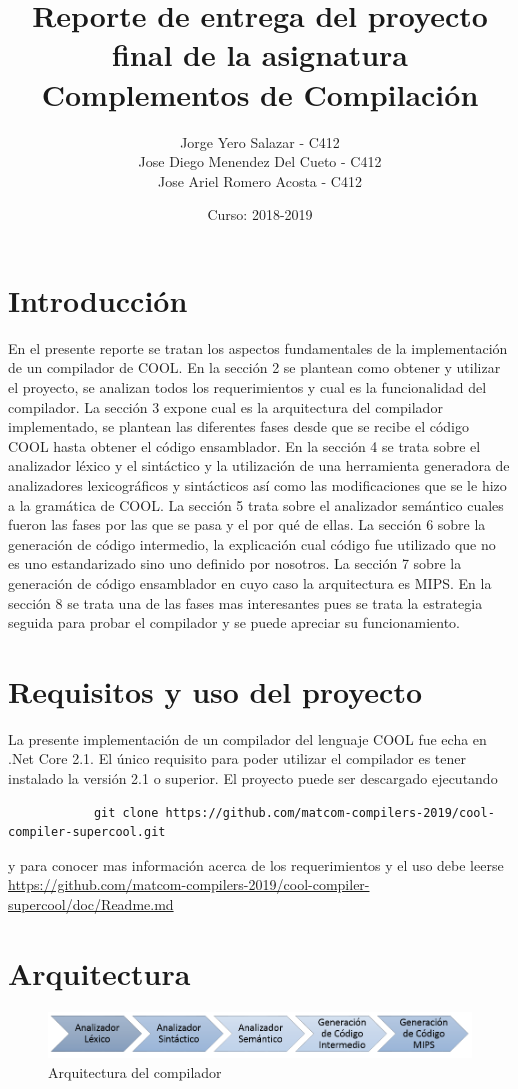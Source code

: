 \documentclass[12pt,a4paper]{article}
\author{Jorge Yero Salazar - C412\\ Jose Diego Menendez Del Cueto - C412\\ Jose Ariel Romero Acosta - C412}
\title{Reporte de entrega del proyecto final de la
	asignatura Complementos de Compilación}
\date{Curso: 2018-2019}
\begin{document}
	\maketitle
	\tableofcontents
	\section{Introducción}
		En el presente reporte se tratan los aspectos fundamentales de la implementación de un compilador de COOL. En la sección 2 se plantean como obtener y utilizar el proyecto, se analizan todos los requerimientos y cual es la funcionalidad del compilador. La sección 3 expone cual es la arquitectura del compilador implementado, se plantean las diferentes fases desde que se recibe el código COOL hasta obtener el código ensamblador. En la sección 4 se trata sobre el analizador léxico y el sintáctico y la utilización de una herramienta generadora de analizadores lexicográficos y sintácticos así como las modificaciones que se le hizo a la gramática de COOL. La sección 5 trata sobre el analizador semántico cuales fueron las fases por las que se pasa y el por qué de ellas. La sección 6 sobre la generación de código intermedio, la explicación cual código fue utilizado que no es uno estandarizado sino uno definido por nosotros. La sección 7 sobre la generación de código ensamblador en cuyo caso la arquitectura es MIPS. En la sección 8 se trata una de las fases mas interesantes pues se trata la estrategia seguida para probar el compilador y se puede apreciar su funcionamiento.
	\section{Requisitos y uso del proyecto}
		La presente implementación de un compilador del lenguaje COOL fue echa en
		.Net Core 2.1. El único requisito para poder utilizar el compilador es tener instalado la versión 2.1 o superior. El proyecto puede ser descargado ejecutando 
		\begin{lstlisting}
			git clone https://github.com/matcom-compilers-2019/cool-compiler-supercool.git
		\end{lstlisting}
		y para conocer mas información acerca de los requerimientos y el uso debe leerse \url{https://github.com/matcom-compilers-2019/cool-compiler-supercool/doc/Readme.md}
	\section{Arquitectura}
		\begin{figure}[H]
			\centering
			\includegraphics[scale=0.5]{Informe/Arquitectura.png}
			\caption{Arquitectura del compilador}
		\end{figure}
\end{document}
